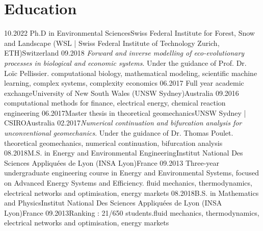 \section*{Education}
\begin{experiences}
    \experience
      {10.2022}   {Ph.D in Environmental Sciences}{Swiss Federal Institute for Forest, Snow and Landscape (WSL | Swiss Federal Institute of Technology Zurich, ETH)}{Switzerland}
      {09.2018} {\textit{Forward and inverse modelling of eco-evolutionary processes in biological and economic systems}.
                      Under the guidance of Prof. Dr. Loïc Pellissier.
                      }
                      {computational biology, mathematical modeling, scientific machine learning, complex systems, complexity economics}
    \emptySeparator
    \experienceshort
      {06.2017} {Full year academic exchange}{University of New South Wales (UNSW Sydney)}{Australia}
      {09.2016} {computational methods for finance, electrical energy, chemical reaction engineering}
    \emptySeparator
    \experience
      {06.2017}{Master thesis in theoretical geomechanics}{UNSW Sydney | CSIRO}{Australia}
      {02.2017}{\textit{Numerical continuation and bifurcation analysis for unconventional geomechanics}. Under the guidance of Dr. Thomas Poulet.
                      }
                      {theoretical geomechanics, numerical continuation, bifurcation analysis}
    \emptySeparator
    \experience
    {08.2018}{M.S. in Energy and Environmental Engineering}{Institut National Des Sciences Appliquées de Lyon (INSA Lyon)}{France}
    {09.2013} {Three-year undergraduate engineering course in Energy and Environmental Systems, focused on Advanced Energy Systems and Efficiency.
    }{fluid mechanics, thermodynamics, electrical networks and optimisation, energy markets}
    \emptySeparator
    \experience
    {08.2018}{B.S. in Mathematics and Physics}{Institut National Des Sciences Appliquées de Lyon (INSA Lyon)}{France}
    {09.2013}{Ranking : 21/650 students.}{fluid mechanics, thermodynamics, electrical networks and optimisation, energy markets}
  \end{experiences}

